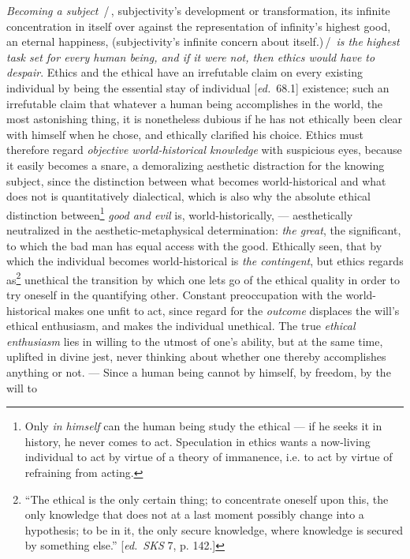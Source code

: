 \documentclass[12pt,a4paper,openany]{book}
\newcommand{\kpage}[1]{\marginnote{\footnotesize\textit{[#1]}}}
\newcommand{\ed}[1]{{\small[\textit{ed.}\ #1]}}
\newcommand{\ins}[1]{\,/\,#1\,/\,}
\begin{document}
\emph{Becoming a subject} \ins{, subjectivity's development or transformation,
its infinite concentration in itself over against the representation of
infinity's highest good, an eternal happiness, (subjectivity's
infinite concern about itself.)} \emph{is the highest task set for every
human being, and if it were not, then ethics would have to despair}. Ethics and
the ethical have an irrefutable claim on every existing individual by
being the essential stay of individual \ed{68.1} existence; such an
irrefutable claim that whatever a human being accomplishes in the world,
the most astonishing thing, it is nonetheless dubious if he has not ethically
\kpage{115}been clear with himself when he chose, and ethically clarified his choice. Ethics
must therefore regard \emph{objective world-historical knowledge} with suspicious
eyes, because it easily becomes a snare, a demoralizing aesthetic
distraction for the knowing subject, since the distinction between
what becomes world-historical and what does not is quantitatively
dialectical, which is also why the absolute ethical distinction between\footnote[43]{Only \emph{in himself} can the human being study the ethical --- if he seeks it in history,
he never comes to act. Speculation in ethics wants a now-living individual
to act by virtue of a theory of immanence, i.e. to act by virtue of refraining
from acting.}
\emph{good and evil} is, world-historically, --- aesthetically neutralized in the
aesthetic-metaphysical determination: \emph{the great}, the significant,
to which the bad man has equal access with the good. Ethically seen,
that by which the individual becomes world-historical is \emph{the contingent}, but
ethics regards as\footnote[44]{``The ethical is the only certain thing; to concentrate oneself upon this, the only knowledge that
does not at a last moment possibly change into a hypothesis; to be in it, the
only secure knowledge, where knowledge is secured by something else.'' \ed{\emph{SKS} 7, p. 142.}}
unethical the transition by which one lets go of
the ethical quality in order to try oneself in the quantifying other.
Constant preoccupation with the world-historical makes one unfit to
act, since regard for the \emph{outcome} displaces the will's ethical enthusiasm,
and makes the individual unethical. The true \emph{ethical enthusiasm} lies
in willing to the utmost of one's ability, but at the same time, uplifted in divine
jest, never thinking about whether one thereby accomplishes anything or not.
--- Since a human being cannot by himself, by freedom, by the will to
\end{document}
